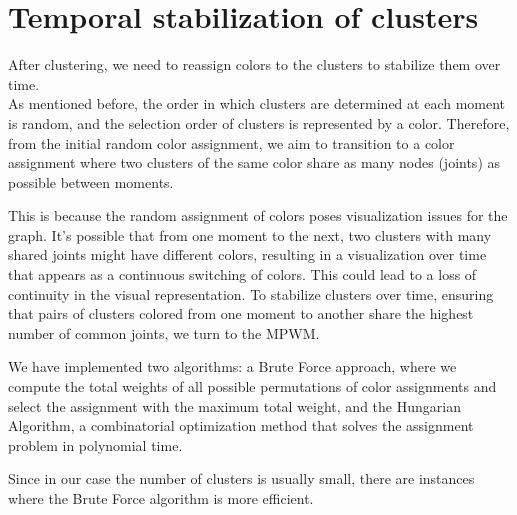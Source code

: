 \chapter{Temporal stabilization of clusters}

After clustering, we need to reassign colors to the clusters to stabilize them over time. \\
As mentioned before, the order in which clusters are determined at each moment is random, and the selection order of clusters is represented by a color. Therefore, from the initial random color assignment, we aim to transition to a color assignment where two clusters of the same color share as many nodes (joints) as possible between moments.

This is because the random assignment of colors poses visualization issues for the graph. It's possible that from one moment to the next, two clusters with many shared joints might have different colors, resulting in a visualization over time that appears as a continuous switching of colors. This could lead to a loss of continuity in the visual representation.
To stabilize clusters over time, ensuring that pairs of clusters colored from one moment to another share the highest number of common joints, we turn to the MPWM.

We have implemented two algorithms: a Brute Force approach, where we compute the total weights of all possible permutations of color assignments and select the assignment with the maximum total weight, and the Hungarian Algorithm, a combinatorial optimization method that solves the assignment problem in polynomial time.

Since in our case the number of clusters is usually small, there are instances where the Brute Force algorithm is more efficient.

